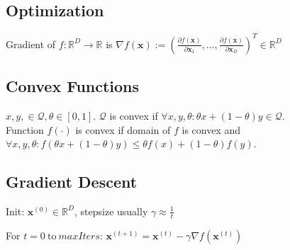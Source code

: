 \documentclass[a4paper, 11pt, landscape]{article}
\DeclareMathOperator*{\argmin}{arg\,min}
\begin{document}
\begin{multicols*}{3}
\section{Optimization}
Gradient of $f: \mathbb{R}^D \to \mathbb{R}$ is $\nabla f(\mathbf{x}) := \left( \frac{\partial f(\mathbf{x})}{\partial \mathbf{x}_1}, \ldots, \frac{\partial f(\mathbf{x})}{\partial \mathbf{x}_D} \right)^T \in \mathbb{R}^D$

\subsection{Convex Functions}
$x,y, \in \mathcal{Q}, \theta \in [0,1]$.
$\mathcal{Q}$ is convex if $\forall x,y,\theta : \theta x +(1-\theta) y \in \mathcal{Q}$.\\
Function $f(\cdot)$ is convex if domain of $f$ is convex and \\
$\forall x,y,\theta : f(\theta x+(1-\theta)y) \leq \theta f(x)+(1-\theta) f(y)$.


\subsection{Gradient Descent}
\begin{inparaenum}
	\item Init: $\mathbf{x}^{(0)} \in \mathbb{R}^D$, stepsize usually $\gamma \approx \frac{1}{t}$
	\item For $t = 0 \ \text{to} \ \mathit{maxIters}$: $\mathbf{x}^{(t+1)} = \mathbf{x}^{(t)} - \gamma \nabla f(\mathbf{x}^{(t)})$
\end{inparaenum}


\end{multicols*}
\end{document}
